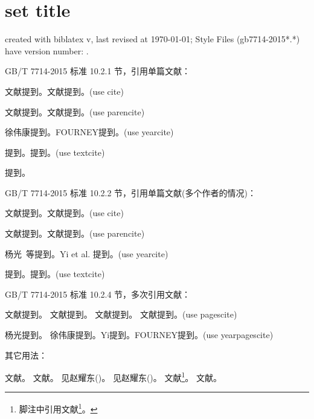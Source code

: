 \documentclass[twoside]{article}
\begin{document}
    \section{set title}
    created with biblatex v\versionofbiblatex, last revised at \today; Style Files (gb7714-2015*.*) have version number: \versionofgbtstyle.

\bigskip
    GB/T 7714-2015 标准 10.2.1 节，引用单篇文献：

    文献\cite{徐伟康2010对}提到。文献\cite{FOURNEY1971-17-38}提到。(use cite)\par
    文献\parencite{徐伟康2010对}提到。文献\parencite{FOURNEY1971-17-38}提到。(use parencite)\par
    徐伟康提到。FOURNEY提到。(use yearcite)\par
    \textcite{徐伟康2010对}提到。\textcite{FOURNEY1971-17-38}提到。(use textcite)\par
    \textcite{徐伟康2011}提到。

\bigskip
    GB/T 7714-2015 标准 10.2.2 节，引用单篇文献(多个作者的情况)：

    文献\cite{杨光2015经济波动}提到。文献\cite{Yi2013--}提到。(use cite)\par
    文献\parencite{杨光2015经济波动}提到。文献\parencite{Yi2013--}提到。(use parencite)\par
    杨光\ 等提到。Yi et al. 提到。(use yearcite)\par
    \textcite{杨光2015经济波动}提到。\textcite{Yi2013--}提到。(use textcite)\par


\bigskip
    GB/T 7714-2015 标准 10.2.4 节，多次引用文献：

    文献提到。
    文献提到。
    文献提到。
    文献提到。(use pagescite)\par
    杨光提到。
    徐伟康提到。Yi提到。FOURNEY提到。(use yearpagescite)\par

\bigskip
    其它用法：

    文献\cite[见][49页]{杨光2015经济波动}。
    文献\parencite[见][49页]{杨光2015经济波动}。
    见赵耀东(\cite*{杨光2015经济波动})。
    见赵耀东(\citeyear{杨光2015经济波动})。
    文献\footnote{脚注中引用文献\footcite{杨光2015经济波动}。}。
    文献。


    \printbibliography

    
\end{document}
